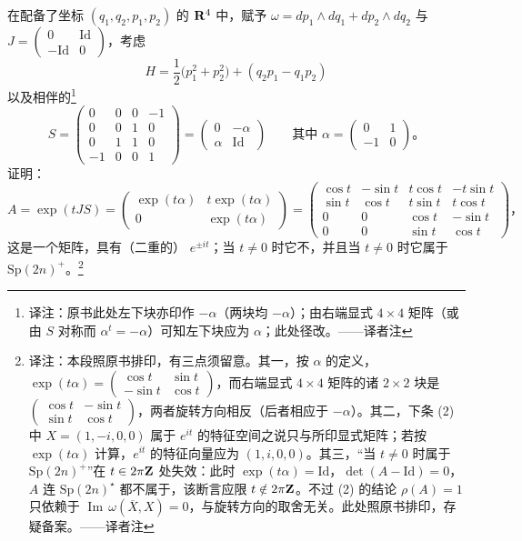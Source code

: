 \begin{exercise}\label{ex:ch14-039-rho-jordan-block}
在配备了坐标 $(q_1,q_2,p_1,p_2)$ 的 $\mathbf{R}^{4}$ 中，赋予\trSymplecticForm{}
$\omega=dp_1\wedge dq_1+dp_2\wedge dq_2$ 与\trComplexStructure{}
$J=\begin{pmatrix}0&\mathrm{Id}\\-\mathrm{Id}&0\end{pmatrix}$，考虑\trQuadraticForm
\[
H=\frac{1}{2}\bigl(p_1^{2}+p_2^{2}\bigr)+(q_2p_1-q_1p_2)
\]
以及相伴的\trSymmetricMatrix\footnote{译注：原书此处左下块亦印作 $-\alpha$（两块均 $-\alpha$）；由右端显式 $4\times4$ 矩阵（或由 $S$ 对称而 $\alpha^{t}=-\alpha$）可知左下块应为 $\alpha$；此处径改。——译者注}
\[
S=\begin{pmatrix}
0&0&0&-1\\
0&0&1&0\\
0&1&1&0\\
-1&0&0&1
\end{pmatrix}
=\begin{pmatrix}0&-\alpha\\ \alpha&\mathrm{Id}\end{pmatrix}
\qquad\text{其中 }\alpha=\begin{pmatrix}0&1\\-1&0\end{pmatrix}\text{。}
\]
证明：
\[
A=\exp(tJS)=\begin{pmatrix}\exp(t\alpha) & t\exp(t\alpha)\\[2pt] 0 & \exp(t\alpha)\end{pmatrix}
=\begin{pmatrix}
\cos t & -\sin t & t\cos t & -t\sin t\\
\sin t & \cos t & t\sin t & t\cos t\\
0 & 0 & \cos t & -\sin t\\
0 & 0 & \sin t & \cos t
\end{pmatrix}\text{，}
\]
这是一个\trSymplectic{}矩阵，具有（二重的）\trEigenvalue{} $e^{\pm it}$；当 $t\neq0$ 时它不\trDiagonalizable，并且当 $t\neq0$ 时它属于 $\mathrm{Sp}(2n)^{+}$。\footnote{译注：本段照原书排印，有三点须留意。其一，按 $\alpha$ 的定义，$\exp(t\alpha)=\begin{pmatrix}\cos t&\sin t\\-\sin t&\cos t\end{pmatrix}$，而右端显式 $4\times4$ 矩阵的诸 $2\times2$ 块是 $\begin{pmatrix}\cos t&-\sin t\\\sin t&\cos t\end{pmatrix}$，两者旋转方向相反（后者相应于 $-\alpha$）。其二，下条 (2) 中 $X=(1,-i,0,0)$ 属于\trEigenvalue{} $e^{it}$ 的特征空间之说只与所印显式矩阵\trCompatible；若按 $\exp(t\alpha)$ 计算，$e^{it}$ 的特征向量应为 $(1,i,0,0)$。其三，“当 $t\neq0$ 时属于 $\mathrm{Sp}(2n)^{+}$”在 $t\in2\pi\mathbf{Z}$ 处失效：此时 $\exp(t\alpha)=\mathrm{Id}$，$\det(A-\mathrm{Id})=0$，$A$ 连 $\mathrm{Sp}(2n)^{\star}$ 都不属于，该断言应限 $t\notin2\pi\mathbf{Z}$。不过 (2) 的结论 $\rho(A)=1$ 只依赖于 $\operatorname{Im}\,\omega(\overline{X},X)=0$，与旋转方向的取舍无关。此处照原书排印，存疑备案。——译者注}


\end{exercise}
